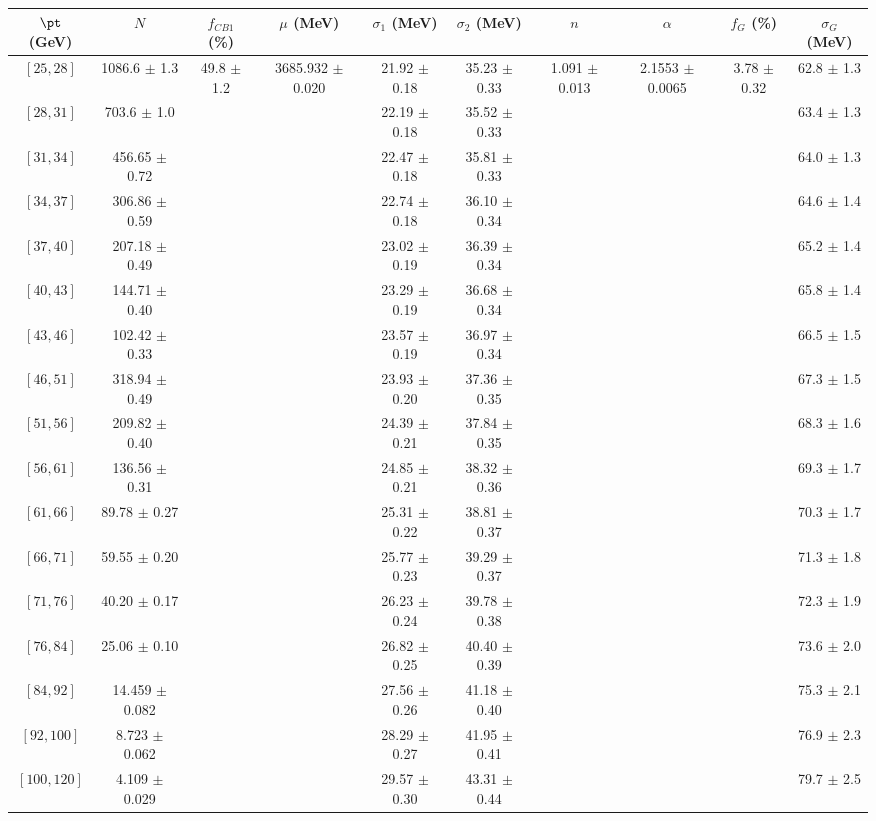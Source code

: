 \begin{tabular}{c||c|c|c|c|c|c|c|c|c}
$\pt$ (GeV) & $N$ & $f_{CB1}$ (\%)  & $\mu$ (MeV) & $\sigma_1$ (MeV) & $\sigma_2$ (MeV) & $n$ & $\alpha$ & $f_G$ (\%) & $\sigma_G$ (MeV) \\
\hline
$[25, 28]$ & 1086.6 $\pm$ 1.3 & \multirow{17}{*}{49.8 $\pm$ 1.2} & \multirow{17}{*}{3685.932 $\pm$ 0.020} & 21.92 $\pm$ 0.18 & 35.23 $\pm$ 0.33 & \multirow{17}{*}{1.091 $\pm$ 0.013} & \multirow{17}{*}{2.1553 $\pm$ 0.0065} & \multirow{17}{*}{3.78 $\pm$ 0.32} & 62.8 $\pm$ 1.3\\
$[28, 31]$ & 703.6 $\pm$ 1.0 &  &  & 22.19 $\pm$ 0.18 & 35.52 $\pm$ 0.33 &  &  &  & 63.4 $\pm$ 1.3\\
$[31, 34]$ & 456.65 $\pm$ 0.72 &  &  & 22.47 $\pm$ 0.18 & 35.81 $\pm$ 0.33 &  &  &  & 64.0 $\pm$ 1.3\\
$[34, 37]$ & 306.86 $\pm$ 0.59 &  &  & 22.74 $\pm$ 0.18 & 36.10 $\pm$ 0.34 &  &  &  & 64.6 $\pm$ 1.4\\
$[37, 40]$ & 207.18 $\pm$ 0.49 &  &  & 23.02 $\pm$ 0.19 & 36.39 $\pm$ 0.34 &  &  &  & 65.2 $\pm$ 1.4\\
$[40, 43]$ & 144.71 $\pm$ 0.40 &  &  & 23.29 $\pm$ 0.19 & 36.68 $\pm$ 0.34 &  &  &  & 65.8 $\pm$ 1.4\\
$[43, 46]$ & 102.42 $\pm$ 0.33 &  &  & 23.57 $\pm$ 0.19 & 36.97 $\pm$ 0.34 &  &  &  & 66.5 $\pm$ 1.5\\
$[46, 51]$ & 318.94 $\pm$ 0.49 &  &  & 23.93 $\pm$ 0.20 & 37.36 $\pm$ 0.35 &  &  &  & 67.3 $\pm$ 1.5\\
$[51, 56]$ & 209.82 $\pm$ 0.40 &  &  & 24.39 $\pm$ 0.21 & 37.84 $\pm$ 0.35 &  &  &  & 68.3 $\pm$ 1.6\\
$[56, 61]$ & 136.56 $\pm$ 0.31 &  &  & 24.85 $\pm$ 0.21 & 38.32 $\pm$ 0.36 &  &  &  & 69.3 $\pm$ 1.7\\
$[61, 66]$ & 89.78 $\pm$ 0.27 &  &  & 25.31 $\pm$ 0.22 & 38.81 $\pm$ 0.37 &  &  &  & 70.3 $\pm$ 1.7\\
$[66, 71]$ & 59.55 $\pm$ 0.20 &  &  & 25.77 $\pm$ 0.23 & 39.29 $\pm$ 0.37 &  &  &  & 71.3 $\pm$ 1.8\\
$[71, 76]$ & 40.20 $\pm$ 0.17 &  &  & 26.23 $\pm$ 0.24 & 39.78 $\pm$ 0.38 &  &  &  & 72.3 $\pm$ 1.9\\
$[76, 84]$ & 25.06 $\pm$ 0.10 &  &  & 26.82 $\pm$ 0.25 & 40.40 $\pm$ 0.39 &  &  &  & 73.6 $\pm$ 2.0\\
$[84, 92]$ & 14.459 $\pm$ 0.082 &  &  & 27.56 $\pm$ 0.26 & 41.18 $\pm$ 0.40 &  &  &  & 75.3 $\pm$ 2.1\\
$[92, 100]$ & 8.723 $\pm$ 0.062 &  &  & 28.29 $\pm$ 0.27 & 41.95 $\pm$ 0.41 &  &  &  & 76.9 $\pm$ 2.3\\
$[100, 120]$ & 4.109 $\pm$ 0.029 &  &  & 29.57 $\pm$ 0.30 & 43.31 $\pm$ 0.44 &  &  &  & 79.7 $\pm$ 2.5\\
\end{tabular}
